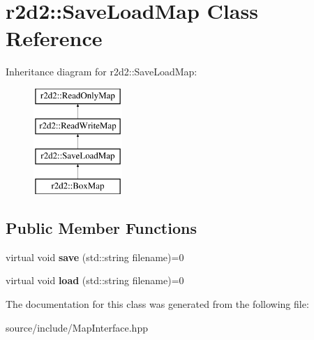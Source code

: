 \hypertarget{classr2d2_1_1_save_load_map}{}\section{r2d2\+:\+:Save\+Load\+Map Class Reference}
\label{classr2d2_1_1_save_load_map}
Inheritance diagram for r2d2\+:\+:Save\+Load\+Map\+:\begin{figure}[H]
\begin{center}
\leavevmode
\includegraphics[height=4.000000cm]{classr2d2_1_1_save_load_map}
\end{center}
\end{figure}
\subsection*{Public Member Functions}
\begin{DoxyCompactItemize}
\item 
\hypertarget{classr2d2_1_1_save_load_map_a6739a265b27535e96d50b9889308ec2a}{}virtual void {\bfseries save} (std\+::string filename)=0\label{classr2d2_1_1_save_load_map_a6739a265b27535e96d50b9889308ec2a}

\item 
\hypertarget{classr2d2_1_1_save_load_map_ae7e67d4a8dca19cd3f96139f5b401a0a}{}virtual void {\bfseries load} (std\+::string filename)=0\label{classr2d2_1_1_save_load_map_ae7e67d4a8dca19cd3f96139f5b401a0a}

\end{DoxyCompactItemize}


The documentation for this class was generated from the following file\+:\begin{DoxyCompactItemize}
\item 
source/include/Map\+Interface.\+hpp\end{DoxyCompactItemize}
